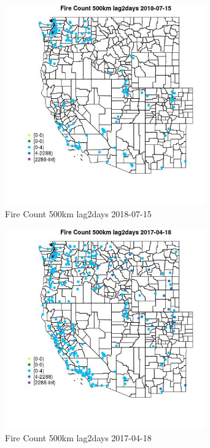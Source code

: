 \begin{figure} 
\centering  
\includegraphics[width=0.77\textwidth]{Code_Outputs/Report_ML_input_PM25_Step4_part_e_de_duplicated_aves_compiled_2019-05-21wNAs_MapObsFire_Count_500km_lag2days2018-07-15.jpg} 
\caption{\label{fig:Report_ML_input_PM25_Step4_part_e_de_duplicated_aves_compiled_2019-05-21wNAsMapObsFire_Count_500km_lag2days2018-07-15}Fire Count 500km lag2days 2018-07-15} 
\end{figure} 
 

\begin{figure} 
\centering  
\includegraphics[width=0.77\textwidth]{Code_Outputs/Report_ML_input_PM25_Step4_part_e_de_duplicated_aves_compiled_2019-05-21wNAs_MapObsFire_Count_500km_lag2days2017-04-18.jpg} 
\caption{\label{fig:Report_ML_input_PM25_Step4_part_e_de_duplicated_aves_compiled_2019-05-21wNAsMapObsFire_Count_500km_lag2days2017-04-18}Fire Count 500km lag2days 2017-04-18} 
\end{figure} 
 

